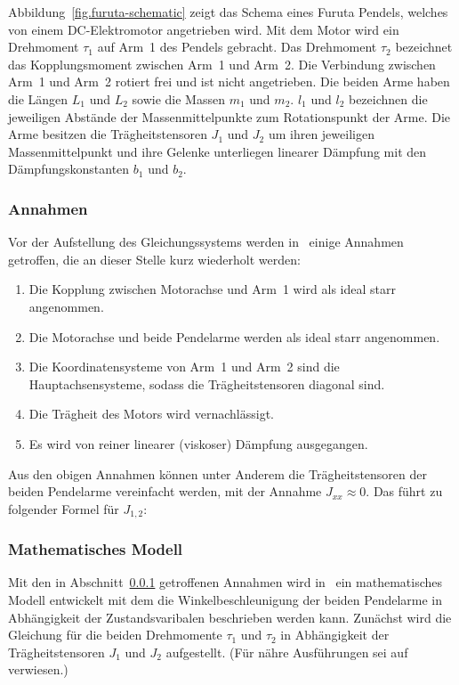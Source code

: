 Abbildung~\ref{fig.furuta-schematic} zeigt das Schema eines Furuta Pendels, welches von einem DC-Elektromotor angetrieben wird.
Mit dem Motor wird ein Drehmoment $\tau_1$ auf Arm~1 des Pendels gebracht. 
Das Drehmoment $\tau_2$ bezeichnet das Kopplungsmoment zwischen Arm~1 und Arm~2. 
Die Verbindung zwischen Arm~1 und Arm~2 rotiert frei und ist nicht angetrieben.
Die beiden Arme haben die Längen $L_1$ und $L_2$ sowie die Massen $m_1$ und $m_2$.
$l_1$ und $l_2$ bezeichnen die jeweiligen Abstände der Massenmittelpunkte zum Rotationspunkt der Arme.
Die Arme besitzen die Trägheitstensoren $J_1$ und $J_2$ um ihren jeweiligen Massenmittelpunkt und ihre Gelenke unterliegen linearer Dämpfung mit den Dämpfungskonstanten $b_1$ und $b_2$.

\subsubsection{Annahmen}
\label{sub.sub.Annahmen}
Vor der Aufstellung des Gleichungssystems werden in~\cite{Cazzolato.2011} einige Annahmen getroffen, die an dieser Stelle kurz wiederholt werden:
\begin{enumerate}
\item Die Kopplung zwischen Motorachse und Arm~1 wird als ideal starr angenommen.
\item Die Motorachse und beide Pendelarme werden als ideal starr angenommen.
\item Die Koordinatensysteme von Arm~1 und Arm~2 sind die Hauptachsensysteme, sodass die Trägheitstensoren diagonal sind.
\item Die Trägheit des Motors wird vernachlässigt. %
\item Es wird von reiner linearer (viskoser) Dämpfung ausgegangen.
\end{enumerate}

Aus den obigen Annahmen können unter Anderem die Trägheitstensoren der beiden Pendelarme vereinfacht werden, mit der Annahme $J_{xx} \approx 0$. 
Das führt zu folgender Formel für $J_{1,2}$:


\subsubsection{Mathematisches Modell}
\label{sub.sub.Mathematisches-Modell}
Mit den in Abschnitt~\ref{sub.sub.Annahmen} getroffenen Annahmen wird in~\cite{Cazzolato.2011} ein mathematisches Modell entwickelt mit dem die Winkelbeschleunigung der beiden Pendelarme in Abhängigkeit der Zustands\-varibalen beschrieben werden kann. 
Zunächst wird die Gleichung für die beiden Drehmomente $\tau_1$ und $\tau_2$ in Abhängigkeit der Trägheitstensoren $J_1$ und $J_2$ aufgestellt.
(Für nähre Ausführungen sei auf~\cite{Cazzolato.2011} verwiesen.)

